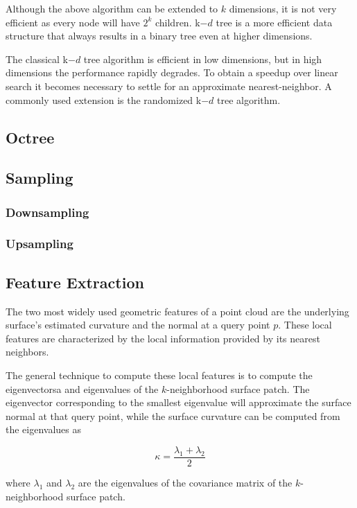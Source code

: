 Although the above algorithm can be extended to $k$ dimensions, it is not very efficient as every node will have $2^k$ children. k$-d$ tree is a more efficient data structure that always results in a binary tree even at higher dimensions.


The classical k$-d$ tree algorithm is efficient in low dimensions, but in high dimensions the performance rapidly degrades. To obtain a speedup over linear search it becomes necessary to settle for an approximate nearest-neighbor. A commonly used extension is the randomized k$-d$ tree algorithm.

\subsection{Octree}

\subsection{Sampling}

\subsubsection{Downsampling}

\subsubsection{Upsampling}



\subsection{Feature Extraction}

The two most widely used geometric features of a point cloud are the underlying surface's estimated curvature and the normal at a query point $p$. These local features are characterized by the local information provided by its nearest neighbors.

The general technique to compute these local features is to compute the eigenvectorsa and eigenvalues of the $k$-neighborhood surface patch. The eigenvector corresponding to the smallest eigenvalue will approximate the surface normal at that query point, while the surface curvature can be computed from the eigenvalues as

$$
\kappa = \frac{\lambda_1 + \lambda_2}{2}
$$

where $\lambda_1$ and $\lambda_2$ are the eigenvalues of the covariance matrix of the $k$-neighborhood surface patch.

